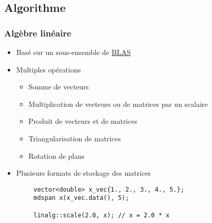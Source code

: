 \documentclass[C++.tex]{subfiles}
\begin{document}
\subsection*{Algorithme}
\begin{frame}[fragile]
	\frametitle{Algèbre linéaire}
	\begin{itemize}
		\item Basé sur un sous-ensemble de \href{https://www.netlib.org/blas/}{BLAS\linklogo}
		\item Multiples opérations
		\begin{itemize}
			\item Somme de vecteurs
			\item Multiplication de vecteurs ou de matrices par un scalaire
			\item Produit de vecteurs et de matrices
			\item Triangularisation de matrices
			\item Rotation de plans
		\end{itemize}
		\item Plusieurs formats de stockage des matrices
	\end{itemize}

	\begin{verbatim}
		vector<double> x_vec{1., 2., 3., 4., 5.};
		mdspan x(x_vec.data(), 5);

		linalg::scale(2.0, x); // x = 2.0 * x
	\end{verbatim}

\end{frame}
\end{document}

